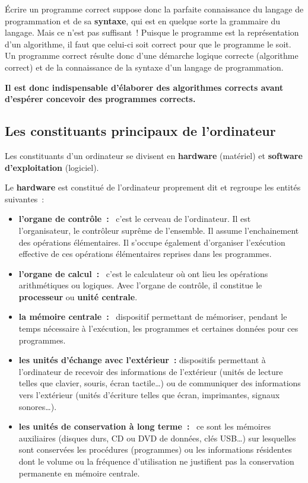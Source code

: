 			Écrire un programme correct suppose donc 
			la parfaite connaissance du langage de programmation 
			et de sa \textbf{syntaxe}, 
			qui est en quelque sorte la grammaire du langage. 
			Mais ce n’est pas suffisant~! 
			Puisque le programme est la représentation d’un algorithme, 
			il faut que celui-ci soit correct pour que le programme le soit. 
			Un programme correct résulte donc d’une démarche logique correcte 
			(algorithme correct) 
			et de la connaissance de la syntaxe d’un langage de programmation.
			
			\textbf{%
			Il est donc indispensable d’élaborer des algorithmes corrects 
			avant d’espérer concevoir des programmes corrects.
			}
	
		\subsection{Les constituants principaux de l’ordinateur}
		
			Les constituants d’un ordinateur 
			se divisent en \textbf{hardware} (matériel) 
			et \textbf{software d’exploitation} (logiciel).
			
			Le \textbf{hardware} est constitué 
			de l’ordinateur proprement dit 
			et regroupe les entités suivantes~:
	
			\begin{itemize}
			\item
				\textbf{l’organe de contrôle~:}~
				c’est le cerveau de l’ordinateur. 
				Il est l’organisateur, 
				le contrôleur suprême de l’ensemble. 
				Il assume l’enchainement des opérations élémentaires. 
				Il s’occupe également d’organiser l’exécution effective
				de ces opérations élémentaires reprises dans les programmes.
			\item
				\textbf{l’organe de calcul~:}~
				c’est le calculateur 
				où ont lieu les opérations arithmétiques ou logiques. 
				Avec l’organe de contrôle, 
				il constitue le \textbf{processeur} 
				ou \textbf{unité centrale}.
			\item
				\textbf{la mémoire centrale~:}~
				dispositif permettant de mémoriser,
				pendant le temps nécessaire à l’exécution, 
				les programmes et certaines données pour ces programmes.
			\item
				\textbf{les unités d’échange avec l’extérieur~:} 
				dispositifs permettant à l’ordinateur de recevoir 
				des informations de l’extérieur 
				(unités de lecture telles que clavier, souris, écran tactile\dots) 
				ou de communiquer des informations vers l’extérieur 
				(unités d’écriture telles que écran, imprimantes, signaux sonores\dots).
			\item
				\textbf{les unités de conservation à long terme~:}~
				ce sont les mémoires auxiliaires 
				(disques durs, CD ou DVD de données, clés USB\dots) 
				sur lesquelles sont conservées les procédures (programmes) 
				ou les informations résidentes dont le volume 
				ou la fréquence d’utilisation ne justifient pas 
				la conservation permanente en mémoire centrale.
			\end{itemize}
			
